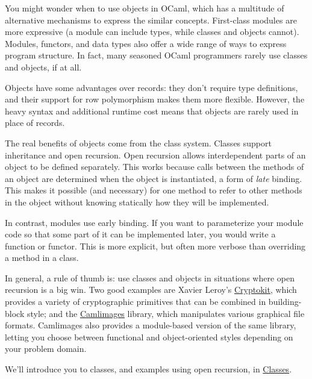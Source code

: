 You might wonder when to use objects in OCaml, which has a multitude of
alternative mechanisms to express the similar concepts. First-class
modules are more expressive (a module can include types, while classes
and objects cannot). Modules, functors, and data types also offer a wide
range of ways to express program structure. In fact, many seasoned OCaml
programmers rarely use classes and objects, if at all.

Objects have some advantages over records: they don't require type
definitions, and their support for row polymorphism makes them more
flexible. However, the heavy syntax and additional runtime cost means
that objects are rarely used in place of records.

The real benefits of objects come from the class system. Classes support
inheritance and open recursion. Open recursion allows interdependent
parts of an object to be defined separately. This works because calls
between the methods of an object are determined when the object is
instantiated, a form of \emph{late} binding. This makes it possible (and
necessary) for one method to refer to other methods in the object
without knowing statically how they will be implemented.

In contrast, modules use early binding. If you want to parameterize your
module code so that some part of it can be implemented later, you would
write a function or functor. This is more explicit, but often more
verbose than overriding a method in a class.

In general, a rule of thumb is: use classes and objects in situations
where open recursion is a big win. Two good examples are Xavier Leroy's
\href{http://gallium.inria.fr/~xleroy/software.html\#cryptokit}{Cryptokit},
which provides a variety of cryptographic primitives that can be
combined in building-block style; and the
\href{http://cristal.inria.fr/camlimages/}{Camlimages} library, which
manipulates various graphical file formats. Camlimages also provides a
module-based version of the same library, letting you choose between
functional and object-oriented styles depending on your problem domain.
 
   

We'll introduce you to classes, and examples using open recursion, in
\href{classes.html\#classes}{Classes}.

